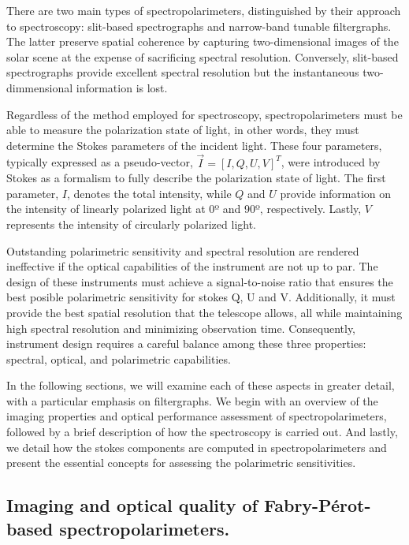 There are two main types of spectropolarimeters, distinguished by their approach to spectroscopy: slit-based spectrographs and narrow-band tunable filtergraphs. The latter preserve spatial coherence by capturing two-dimensional images of the solar scene at the expense of sacrificing spectral resolution. Conversely, slit-based spectrographs provide excellent spectral resolution but the instantaneous two-dimmensional information is lost. 

Regardless of the method employed for spectroscopy, spectropolarimeters must be able to measure the polarization state of light, in other words, they must determine the Stokes parameters of the incident light. These four parameters, typically expressed as a pseudo-vector, $ \vec{I} = [I, Q, U, V] ^{T}$, were introduced by Stokes \citep{Stokes_vector} as a formalism to fully describe the polarization state of light. The first parameter, $I$, denotes the total intensity, while $Q$ and $U$ provide information on the intensity of linearly polarized light at 0º and 90º, respectively. Lastly, $V$ represents the intensity of circularly polarized light.


Outstanding polarimetric sensitivity and spectral resolution are rendered ineffective if the optical capabilities of the instrument are not up to par. The design of these instruments must achieve a signal-to-noise ratio that ensures the best posible polarimetric sensitivity for stokes Q, U and V. Additionally, it must provide the best spatial resolution that the telescope allows, all while maintaining high spectral resolution and minimizing observation time. Consequently, instrument design requires a careful balance among these three properties: spectral, optical, and polarimetric capabilities.

In the following sections, we will examine each of these aspects in greater detail, with a particular emphasis on filtergraphs. We begin with an overview of the imaging properties and optical performance assessment of spectropolarimeters, followed by a brief description of how the spectroscopy is carried out. And lastly, we detail how the stokes components are computed in spectropolarimeters and present the essential concepts for assessing the polarimetric sensitivities. 

\subsection{Imaging and optical quality of Fabry-Pérot-based spectropolarimeters.\label{sec: intro-imaging}}

